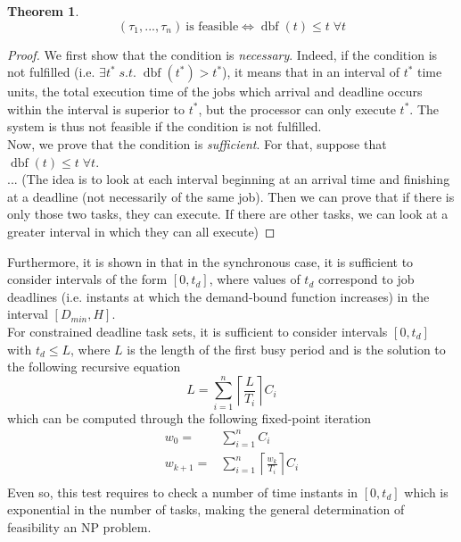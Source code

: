 \documentclass[a4paper,10pt]{article}
\newcommand{\dbf}[1]{\operatorname{dbf}(#1)}
\newtheorem{theorem}{Theorem}
\begin{document}
\begin{theorem}
\[
	(\tau_1, ..., \tau_n) \: \text{is feasible} \iff \dbf{t} \leq t \; \forall t
\]
\end{theorem}

\begin{proof}
	We first show that the condition is \emph{necessary}. Indeed, if the condition
	is not fulfilled (i.e. $\exists t^* \; s.t. \; \dbf{t^*} > t^*$), it means that
	in an interval of $t^*$ time units, the total execution time of the jobs which
	arrival and deadline occurs within the interval is superior to $t^*$, but the
	processor can only execute $t^*$. The system is thus not feasible if the
	condition is not fulfilled.\\

	Now, we prove that the condition is \emph{sufficient}. For that, suppose that $\dbf{t} \leq t \; \forall t$.\\

	... (The idea is to look at each interval beginning at an arrival time and
	finishing at a deadline (not necessarily of the same job). Then we can prove
	that if there is only those two tasks, they can execute. If there are other
	tasks, we can look at a greater interval in which they can all execute)

\end{proof}

Furthermore, it is shown in \cite{baruah1990algorithms} that in the synchronous case, it is
sufficient to consider intervals of the form $[0, t_d]$, where values of
$t_d$ correspond to job deadlines (i.e. instants at which the demand-bound
function increases) in the interval $\left[ D_{min}, H \right]$.\\

For constrained deadline task sets, it is sufficient to consider intervals $[0,
t_d]$ with $t_d \leq L$, where $L$ is the length of the first busy period and is
the solution to the following recursive equation
\[
	L = \sum_{i=1}^{n} \left\lceil \frac{L}{T_i} \right\rceil C_i
\]
which can be computed through the following fixed-point iteration
\[
	\begin{array}{rl}
		w_0 = 		& \sum\limits_{i=1}^{n} C_i \\
		w_{k+1} = 	& \sum\limits_{i=1}^{n} \left\lceil \frac{w_k}{T_i} \right\rceil
		C_i
		\\
	\end{array}
\]
Even so, this test requires to check a number of time instants in $[0,
t_d]$ which is exponential in the number of tasks, making the general
determination of feasibility an NP problem.
\end{document}
